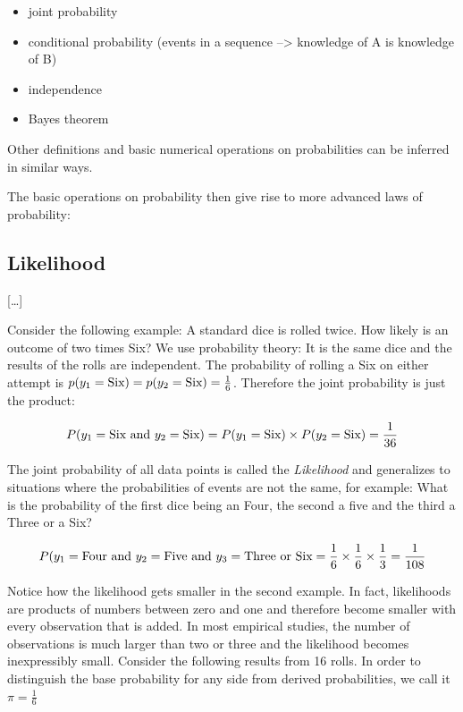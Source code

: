 \documentclass[]{svmono}
\providecommand{\tightlist}{%
  \setlength{\itemsep}{0pt}\setlength{\parskip}{0pt}}
\begin{document}
\begin{itemize}
\tightlist
\item
  joint probability
\item
  conditional probability (events in a sequence --\textgreater{}
  knowledge of A is knowledge of B)
\item
  independence
\item
  Bayes theorem
\end{itemize}

Other definitions and basic numerical operations on probabilities can be
inferred in similar ways.

The basic operations on probability then give rise to more advanced laws
of probability:

\subsection{Likelihood}\label{likelihood}

{[}\ldots{}{]}

Consider the following example: A standard dice is rolled twice. How
likely is an outcome of two times Six? We use probability theory: It is
the same dice and the results of the rolls are independent. The
probability of rolling a Six on either attempt is
\(p(y_1 = \textrm{Six}) = p(y_2 = \textrm{Six}) = {1 \over 6}\).
Therefore the joint probability is just the product:

\[
P(y_1 = \textrm{Six} \textrm{ and } y_2 = \textrm{Six}) \\= 
P(y_1 = \textrm{Six}) \times P(y_2 = \textrm{Six})= {1 \over 36}
\]

The joint probability of all data points is called the \emph{Likelihood}
and generalizes to situations where the probabilities of events are not
the same, for example: What is the probability of the first dice being
an Four, the second a five and the third a Three or a Six?

\[
P(y_1 = \textrm{Four} \textrm{ and } y_2 = \textrm{Five} \textrm{ and } y_3 = \textrm{Three} \textrm{ or } \textrm{Six}\\
=  {1 \over 6}
\times \frac 1 6 \times \frac 1 3 = \frac 1 {108}
\]

Notice how the likelihood gets smaller in the second example. In fact,
likelihoods are products of numbers between zero and one and therefore
become smaller with every observation that is added. In most empirical
studies, the number of observations is much larger than two or three and
the likelihood becomes inexpressibly small. Consider the following
results from 16 rolls. In order to distinguish the base probability for
any side from derived probabilities, we call it \(\pi = \frac 1 6\)
\end{document}
